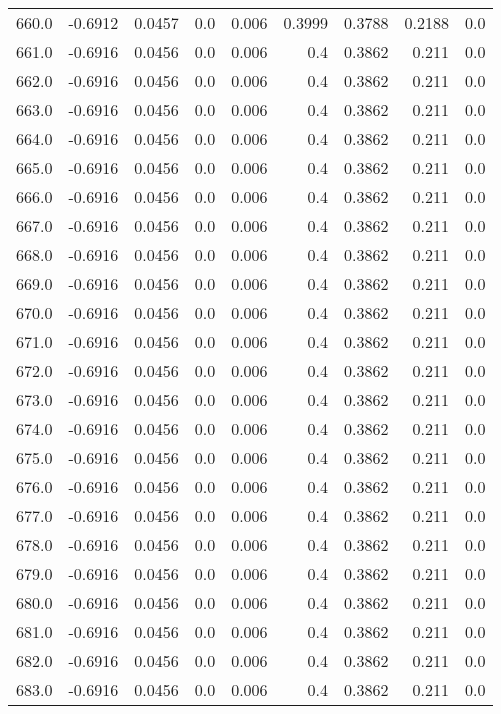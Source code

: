\begin{longtable}{lrrrrrrrr}
660.0 & -0.6912 & 0.0457 & 0.0 & 0.006 & 0.3999 & 0.3788 & 0.2188 & 0.0 \\
661.0 & -0.6916 & 0.0456 & 0.0 & 0.006 & 0.4 & 0.3862 & 0.211 & 0.0 \\
662.0 & -0.6916 & 0.0456 & 0.0 & 0.006 & 0.4 & 0.3862 & 0.211 & 0.0 \\
663.0 & -0.6916 & 0.0456 & 0.0 & 0.006 & 0.4 & 0.3862 & 0.211 & 0.0 \\
664.0 & -0.6916 & 0.0456 & 0.0 & 0.006 & 0.4 & 0.3862 & 0.211 & 0.0 \\
665.0 & -0.6916 & 0.0456 & 0.0 & 0.006 & 0.4 & 0.3862 & 0.211 & 0.0 \\
666.0 & -0.6916 & 0.0456 & 0.0 & 0.006 & 0.4 & 0.3862 & 0.211 & 0.0 \\
667.0 & -0.6916 & 0.0456 & 0.0 & 0.006 & 0.4 & 0.3862 & 0.211 & 0.0 \\
668.0 & -0.6916 & 0.0456 & 0.0 & 0.006 & 0.4 & 0.3862 & 0.211 & 0.0 \\
669.0 & -0.6916 & 0.0456 & 0.0 & 0.006 & 0.4 & 0.3862 & 0.211 & 0.0 \\
670.0 & -0.6916 & 0.0456 & 0.0 & 0.006 & 0.4 & 0.3862 & 0.211 & 0.0 \\
671.0 & -0.6916 & 0.0456 & 0.0 & 0.006 & 0.4 & 0.3862 & 0.211 & 0.0 \\
672.0 & -0.6916 & 0.0456 & 0.0 & 0.006 & 0.4 & 0.3862 & 0.211 & 0.0 \\
673.0 & -0.6916 & 0.0456 & 0.0 & 0.006 & 0.4 & 0.3862 & 0.211 & 0.0 \\
674.0 & -0.6916 & 0.0456 & 0.0 & 0.006 & 0.4 & 0.3862 & 0.211 & 0.0 \\
675.0 & -0.6916 & 0.0456 & 0.0 & 0.006 & 0.4 & 0.3862 & 0.211 & 0.0 \\
676.0 & -0.6916 & 0.0456 & 0.0 & 0.006 & 0.4 & 0.3862 & 0.211 & 0.0 \\
677.0 & -0.6916 & 0.0456 & 0.0 & 0.006 & 0.4 & 0.3862 & 0.211 & 0.0 \\
678.0 & -0.6916 & 0.0456 & 0.0 & 0.006 & 0.4 & 0.3862 & 0.211 & 0.0 \\
679.0 & -0.6916 & 0.0456 & 0.0 & 0.006 & 0.4 & 0.3862 & 0.211 & 0.0 \\
680.0 & -0.6916 & 0.0456 & 0.0 & 0.006 & 0.4 & 0.3862 & 0.211 & 0.0 \\
681.0 & -0.6916 & 0.0456 & 0.0 & 0.006 & 0.4 & 0.3862 & 0.211 & 0.0 \\
682.0 & -0.6916 & 0.0456 & 0.0 & 0.006 & 0.4 & 0.3862 & 0.211 & 0.0 \\
683.0 & -0.6916 & 0.0456 & 0.0 & 0.006 & 0.4 & 0.3862 & 0.211 & 0.0 \\

\end{longtable}

